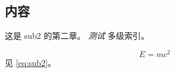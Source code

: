 
\subsection{内容}

这是 sub2 的第二章。
\textit{测试 }多级索引。

\begin{equation}
    E = mc^2 \label{eq:sub2}
\end{equation}
见 \eqref{eq:sub2}。
